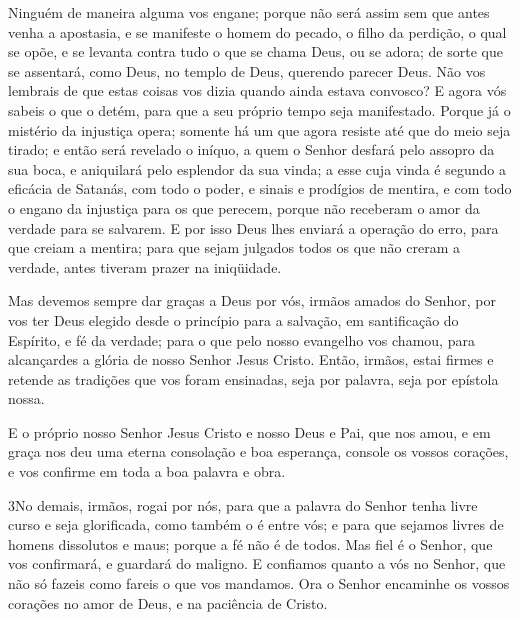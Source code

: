 Ninguém de maneira alguma vos engane; porque não será assim sem
que antes venha a apostasia, e se manifeste o homem do pecado, o
filho da perdição, o qual se opõe, e se levanta contra tudo o
que se chama Deus, ou se adora; de sorte que se assentará, como
Deus, no templo de Deus, querendo parecer Deus. Não vos lembrais
de que estas coisas vos dizia quando ainda estava convosco? E
agora vós sabeis o que o detém, para que a seu próprio tempo seja
manifestado. Porque já o mistério da injustiça opera; somente há
um que agora resiste até que do meio seja tirado; e então será
revelado o iníquo, a quem o Senhor desfará pelo assopro da sua boca,
e aniquilará pelo esplendor da sua vinda; a esse cuja vinda é
segundo a eficácia de Satanás, com todo o poder, e sinais e
prodígios de mentira, e com todo o engano da injustiça para
os que perecem, porque não receberam o amor da verdade para se
salvarem. E por isso Deus lhes enviará a operação do erro,
para que creiam a mentira; para que sejam julgados todos os
que não creram a verdade, antes tiveram prazer na iniqüidade.

Mas devemos sempre dar graças a Deus por vós, irmãos amados do
Senhor, por vos ter Deus elegido desde o princípio para a salvação,
em santificação do Espírito, e fé da verdade; para o que pelo
nosso evangelho vos chamou, para alcançardes a glória de nosso
Senhor Jesus Cristo. Então, irmãos, estai firmes e retende as
tradições que vos foram ensinadas, seja por palavra, seja por
epístola nossa.

E o próprio nosso Senhor Jesus Cristo e nosso Deus e Pai, que nos
amou, e em graça nos deu uma eterna consolação e boa esperança,
console os vossos corações, e vos confirme em toda a boa
palavra e obra.

\medskip

\lettrine{3} No demais, irmãos, rogai por nós, para que a
palavra do Senhor tenha livre curso e seja glorificada, como também
o é entre vós; e para que sejamos livres de homens dissolutos e
maus; porque a fé não é de todos. Mas fiel é o Senhor, que vos
confirmará, e guardará do maligno. E confiamos quanto a vós no
Senhor, que não só fazeis como fareis o que vos mandamos. Ora o
Senhor encaminhe os vossos corações no amor de Deus, e na paciência
de Cristo.

